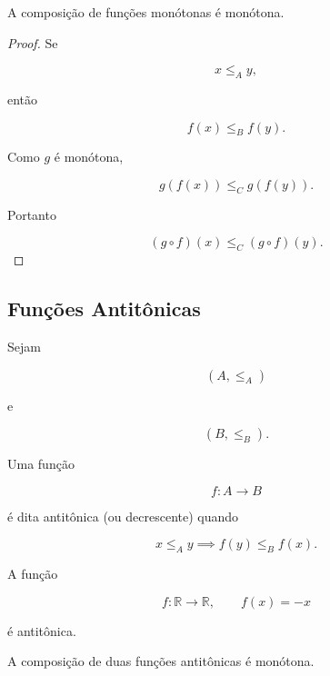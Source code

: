 \documentclass[../../main]{subfiles}
\begin{document}
\begin{prop}
	\label{prop:matematica:funcoes:ordem:composicao}

	A composição de funções monótonas é monótona.

\end{prop}

\begin{proof}

	Se

	\[
		x\le_A y,
	\]

	então

	\[
		f(x)\le_B f(y).
	\]

	Como \(g\) é monótona,

	\[
		g(f(x))
		\le_C
		g(f(y)).
	\]

	Portanto

	\[
		(g\circ f)(x)
		\le_C
		(g\circ f)(y).
	\]

\end{proof}

\subsection{Funções Antitônicas}

\begin{defn}
	\label{def:matematica:funcoes:ordem:antitona}

	Sejam

	\[
		(A,\le_A)
	\]

	e

	\[
		(B,\le_B).
	\]

	Uma função

	\[
		f:A\to B
	\]

	é dita antitônica (ou decrescente) quando

	\[
		x\le_A y
		\implies
		f(y)\le_B f(x).
	\]

\end{defn}

\begin{ex}

	A função

	\[
		f:\mathbb R\to\mathbb R,
		\qquad
		f(x)=-x
	\]

	é antitônica.

\end{ex}

\begin{prop}
	\label{prop:matematica:funcoes:ordem:antitona-composicao}

	A composição de duas funções antitônicas é monótona.

\end{prop}
\end{document}
